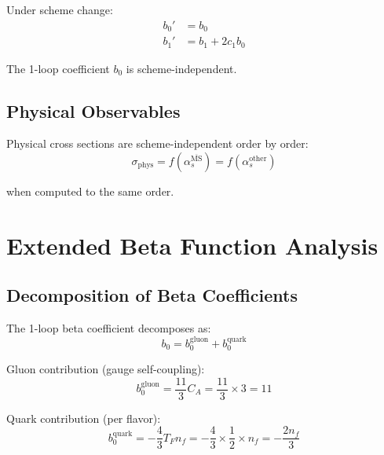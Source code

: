 \documentclass[11pt,a4paper]{article}
\theoremstyle{definition}
\begin{document}
Under scheme change:
\begin{align}
\label{eq:beta-b0-scheme}
b_0' &= b_0 \\
\label{eq:beta-b1-scheme}
b_1' &= b_1 + 2c_1 b_0
\end{align}

The 1-loop coefficient $b_0$ is scheme-independent.

\subsection{Physical Observables}
\label{subsec:phys-obs}

Physical cross sections are scheme-independent order by order:
\begin{equation}
\label{eq:phys-scheme-indep}
\sigma_{\text{phys}} = f(\alpha_s^{\overline{\text{MS}}}) = f(\alpha_s^{\text{other}})
\end{equation}

when computed to the same order.

\section{Extended Beta Function Analysis}
\label{app:beta-analysis}

\subsection{Decomposition of Beta Coefficients}
\label{subsec:beta-decomp}

The 1-loop beta coefficient decomposes as:
\begin{equation}
\label{eq:beta-decomp}
b_0 = b_0^{\text{gluon}} + b_0^{\text{quark}}
\end{equation}

Gluon contribution (gauge self-coupling):
\begin{equation}
\label{eq:beta-gluon}
b_0^{\text{gluon}} = \frac{11}{3}C_A = \frac{11}{3} \times 3 = 11
\end{equation}

Quark contribution (per flavor):
\begin{equation}
\label{eq:beta-quark}
b_0^{\text{quark}} = -\frac{4}{3}T_F n_f = -\frac{4}{3} \times \frac{1}{2} \times n_f = -\frac{2n_f}{3}
\end{equation}
\end{document}
